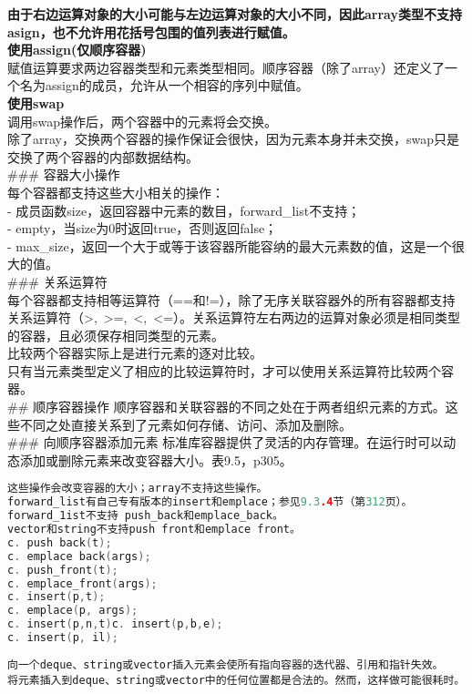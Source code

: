 \documentclass[
  a4paper,
  oneside,tablecaptionabove
]{scrbook}
\begin{document}
\textbf{由于右边运算对象的大小可能与左边运算对象的大小不同，因此array类型不支持asign，也不允许用花括号包围的值列表进行赋值。}\\
\textbf{使用assign(仅顺序容器)}\\
赋值运算要求两边容器类型和元素类型相同。顺序容器（除了array）还定义了一个名为assign的成员，允许从一个相容的序列中赋值。\\
\textbf{使用swap}\\
调用swap操作后，两个容器中的元素将会交换。\\
除了array，交换两个容器的操作保证会很快，因为元素本身并未交换，swap只是交换了两个容器的内部数据结构。\\
\#\#\# 容器大小操作\\
每个容器都支持这些大小相关的操作：\\
- 成员函数size，返回容器中元素的数目，forward\_list不支持；\\
- empty，当size为0时返回true，否则返回false；\\
-
max\_size，返回一个大于或等于该容器所能容纳的最大元素数的值，这是一个很大的值。\\
\#\#\# 关系运算符\\
每个容器都支持相等运算符（==和!=），除了无序关联容器外的所有容器都支持关系运算符（\textgreater{},~\textgreater{}=,~\textless{},~\textless{}=）。关系运算符左右两边的运算对象必须是相同类型的容器，且必须保存相同类型的元素。\\
比较两个容器实际上是进行元素的逐对比较。\\
只有当元素类型定义了相应的比较运算符时，才可以使用关系运算符比较两个容器。\\
\#\# 顺序容器操作
顺序容器和关联容器的不同之处在于两者组织元素的方式。这些不同之处直接关系到了元素如何存储、访问、添加及删除。\\
\#\#\# 向顺序容器添加元素
标准库容器提供了灵活的内存管理。在运行时可以动态添加或删除元素来改变容器大小。表9.5，p305。

\begin{lstlisting}[language={C++}]
这些操作会改变容器的大小；array不支持这些操作。
forward_list有自己专有版本的insert和emplace；参见9.3.4节（第312页）。
forward_1ist不支持 push_back和emplace_back。
vector和string不支持push front和emplace front。
c. push back(t);
c. emplace back(args);
c. push_front(t);
c. emplace_front(args);
c. insert(p,t);
c. emplace(p, args);
c. insert(p,n,t)c. insert(p,b,e);
c. insert(p, il);
\end{lstlisting}

\begin{lstlisting}
向一个deque、string或vector插入元素会使所有指向容器的迭代器、引用和指针失效。  
将元素插入到deque、string或vector中的任何位置都是合法的。然而，这样做可能很耗时。  
\end{lstlisting}
\end{document}
